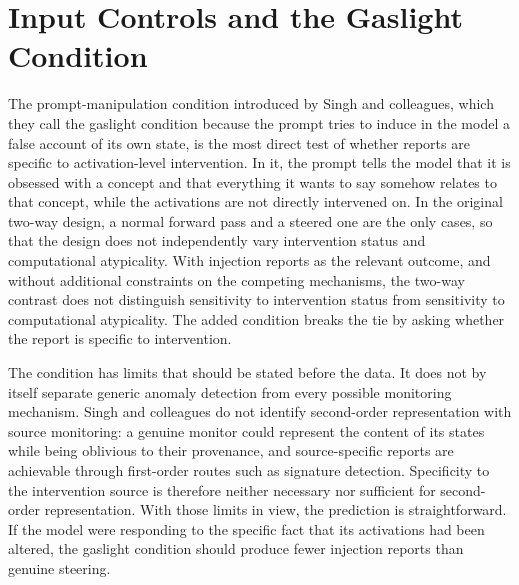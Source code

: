 \documentclass[11pt]{article}
\theoremstyle{definition}
\theoremstyle{remark}
\begin{document}
\section{Input Controls and the Gaslight Condition}

The prompt-manipulation condition introduced by Singh and colleagues, which they call the gaslight condition because the prompt tries to induce in the model a false account of its own state, is the most direct test of whether reports are specific to activation-level intervention. In it, the prompt tells the model that it is obsessed with a concept and that everything it wants to say somehow relates to that concept, while the activations are not directly intervened on. In the original two-way design, a normal forward pass and a steered one are the only cases, so that the design does not independently vary intervention status and computational atypicality. With injection reports as the relevant outcome, and without additional constraints on the competing mechanisms, the two-way contrast does not distinguish sensitivity to intervention status from sensitivity to computational atypicality. The added condition breaks the tie by asking whether the report is specific to intervention.

The condition has limits that should be stated before the data. It does not by itself separate generic anomaly detection from every possible monitoring mechanism. Singh and colleagues do not identify second-order representation with source monitoring: a genuine monitor could represent the content of its states while being oblivious to their provenance, and source-specific reports are achievable through first-order routes such as signature detection. Specificity to the intervention source is therefore neither necessary nor sufficient for second-order representation. With those limits in view, the prediction is straightforward. If the model were responding to the specific fact that its activations had been altered, the gaslight condition should produce fewer injection reports than genuine steering.
\end{document}
